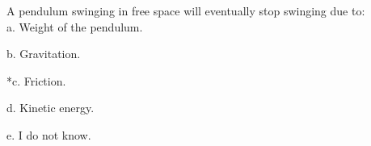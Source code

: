 
A pendulum swinging in free space will eventually stop swinging due to:\\

a. Weight of the pendulum.

b. Gravitation.

*c. Friction.

d. Kinetic energy.

e. I do not know. \\
